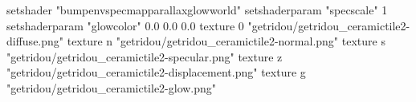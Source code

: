 setshader "bumpenvspecmapparallaxglowworld"
setshaderparam "specscale" 1
setshaderparam "glowcolor" 0.0 0.0 0.0
texture 0 "getridou/getridou_ceramictile2-diffuse.png"
texture n "getridou/getridou_ceramictile2-normal.png"
texture s "getridou/getridou_ceramictile2-specular.png"
texture z "getridou/getridou_ceramictile2-displacement.png"
texture g "getridou/getridou_ceramictile2-glow.png"
